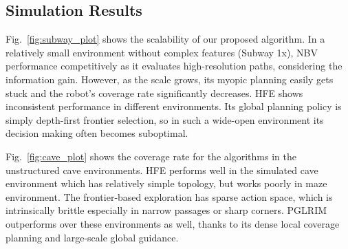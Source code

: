 \documentclass[letterpaper]{article} %
\begin{document}


\subsection{Simulation Results}



Fig.~\ref{fig:subway_plot} shows the scalability of our proposed algorithm. 
In a relatively small environment without complex features (Subway 1x), NBV performance competitively as it evaluates high-resolution paths, considering the information gain.
However, as the scale grows, its myopic planning easily gets stuck and the robot's coverage rate significantly decreases. 
HFE shows inconsistent performance in different environments.
Its global planning policy is simply depth-first frontier selection, so in such a wide-open environment its decision making often becomes suboptimal.
%

Fig.~\ref{fig:cave_plot} shows the coverage rate for the algorithms in the unstructured cave environments. 
HFE performs well in the simulated cave environment which has relatively simple topology, but works poorly in maze environment.
The frontier-based exploration has sparse action space, which is intrinsically brittle especially in narrow passages or sharp corners.
PGLRIM outperforms over these environments as well, thanks to its dense local coverage planning and large-scale global guidance.
\end{document}
